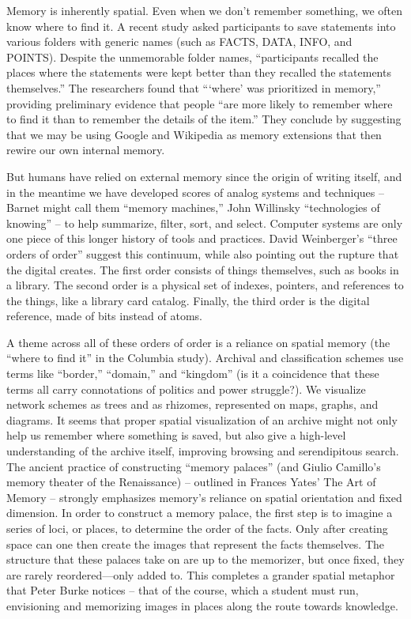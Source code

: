 Memory is inherently spatial. Even when we don’t remember something, we often know where to find it. A recent study asked participants to save statements into various folders with generic names (such as FACTS, DATA, INFO, and POINTS).  Despite the unmemorable folder names, “participants recalled the places where the statements were kept better than they recalled the statements themselves.” The researchers found that “‘where’ was prioritized in memory,” providing preliminary evidence that people “are more likely to remember where to find it than to remember the details of the item.” They conclude by suggesting that we may be using Google and Wikipedia as memory extensions that then rewire our own internal memory.

But humans have relied on external memory since the origin of writing itself, and in the meantime we have developed scores of analog systems and techniques – Barnet might call them “memory machines,” John Willinsky “technologies of knowing” – to help summarize, filter, sort, and select.  Computer systems are only one piece of this longer history of tools and practices. David Weinberger’s “three orders of order” suggest this continuum, while also pointing out the rupture that the digital creates. The first order consists of things themselves, such as books in a library. The second order is a physical set of indexes, pointers, and references to the things, like a library card catalog. Finally, the third order is the digital reference, made of bits instead of atoms. 

A theme across all of these orders of order is a reliance on spatial memory (the “where to find it” in the Columbia study). Archival and classification schemes use terms like “border,” “domain,” and “kingdom” (is it a coincidence that these terms all carry connotations of politics and power struggle?). We visualize network schemes as trees and as rhizomes, represented on maps, graphs, and diagrams. It seems that proper spatial visualization of an archive might not only help us remember where something is saved, but also give a high-level understanding of the archive itself, improving browsing and serendipitous search.
The ancient practice of constructing “memory palaces” (and Giulio Camillo’s memory theater of the Renaissance) – outlined in Frances Yates’ The Art of Memory – strongly emphasizes memory’s reliance on spatial orientation and fixed dimension.  In order to construct a memory palace, the first step is to imagine a series of loci, or places, to determine the order of the facts. Only after creating space can one then create the images that represent the facts themselves. The structure that these palaces take on are up to the memorizer, but once fixed, they are rarely reordered—only added to. This completes a grander spatial metaphor that Peter Burke notices – that of the course, which a student must run, envisioning and memorizing images in places along the route towards knowledge.

